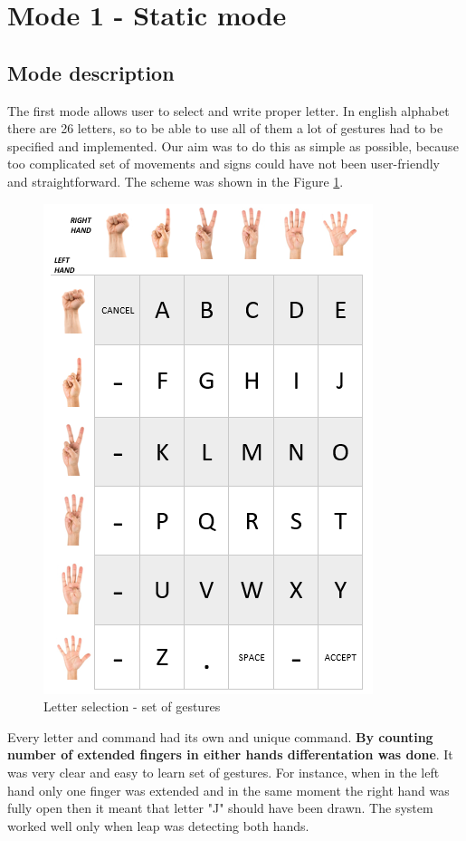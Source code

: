 \section{Mode 1 - Static mode}
\subsection {Mode description}
The first mode allows user to select and write proper letter. In english alphabet there are 26 letters, so to be able to use all of them a lot of gestures had to be specified and implemented. Our aim was to do this as simple as possible, because too complicated set of movements and signs could have not been user-friendly and straightforward. The scheme was shown in the Figure \ref{fig:letters}.

\begin{figure}[H]
	\includegraphics{static_gestures}
	\centering
	\caption{Letter selection - set of gestures}
	\label{fig:letters}
\end{figure}

Every letter and command had its own and unique command. \textbf{By counting number of extended fingers in either hands differentation was done}. It was very clear and easy to learn set of gestures. For instance, when in the left hand only one finger was extended and in the same moment the right hand was fully open then it meant that letter "J" should have been drawn. The system worked well only when leap was detecting both hands.\\

